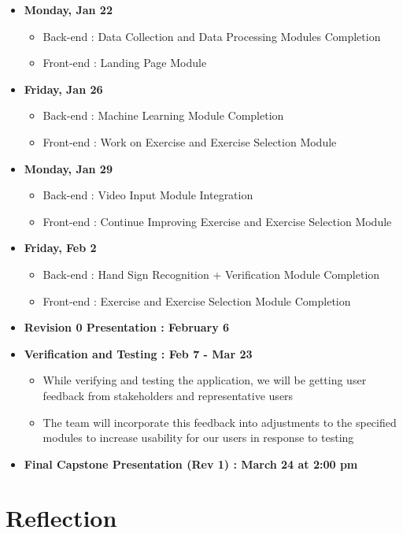 \documentclass[12pt, titlepage]{article}
\begin{document}
\begin{itemize}
    \item \textbf{Monday, Jan 22}
    \begin{itemize}
        \item Back-end  : Data Collection and Data Processing Modules Completion
        \item Front-end : Landing Page Module
    \end{itemize}
    \item \textbf{Friday, Jan 26}
    \begin{itemize}
        \item Back-end  : Machine Learning Module Completion
        \item Front-end : Work on Exercise and Exercise Selection Module
    \end{itemize}
    \item \textbf{Monday, Jan 29}
    \begin{itemize}
        \item Back-end  : Video Input Module Integration
        \item Front-end : Continue Improving Exercise and Exercise Selection Module
    \end{itemize}
    \item \textbf{Friday, Feb 2}
    \begin{itemize}
        \item Back-end  : Hand Sign Recognition + Verification Module Completion
        \item Front-end : Exercise and Exercise Selection Module Completion
    \end{itemize}
    \item \textbf{Revision 0 Presentation : February 6}
    \item \textbf{Verification and Testing : Feb 7 - Mar 23}
    \begin{itemize}
        \item While verifying and testing the application, we will be getting user feedback from stakeholders and representative users
        \item The team will incorporate this feedback into adjustments to the specified modules to increase usability for our users in response to testing
    \end{itemize}
    \item \textbf{Final Capstone Presentation (Rev 1) : March 24 at 2:00 pm}
\end{itemize}

\section{Reflection}
\end{document}
